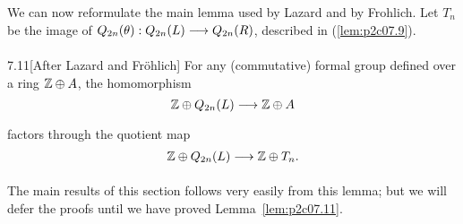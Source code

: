\documentclass[../main]{subfiles}
\begin{document}
\begin{center}
\end{center}

We can now reformulate the main lemma used by Lazard and by Frohlich. Let $T_n$ be the image of $Q_{2n}(\theta) : Q_{2n}(L) \lar{} Q_{2n}(R)$, described in (\ref{lem:p2c07.9}).

\begin{customlemma}{7.11}[After Lazard and Fröhlich]
\label{lem:p2c07.11}
For any (commutative) formal group defined over a ring $\mathbb{Z} \oplus A$, the homomorphism \[\bZ \oplus Q_{2n}(L) \lar{} \bZ \oplus A\] factors through the quotient map \[\bZ \oplus Q_{2n}(L) \lar{} \bZ \oplus T_n.\]
\end{customlemma}

The main results of this section follows very easily from this lemma; but we will defer the proofs until we have proved Lemma~\ref{lem:p2c07.11}. 
\end{document}
